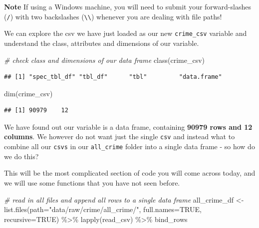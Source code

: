 \documentclass[
]{book}
\newenvironment{Shaded}{\begin{snugshade}}{\end{snugshade}}
\newcommand{\AttributeTok}[1]{\textcolor[rgb]{0.77,0.63,0.00}{#1}}
\newcommand{\CommentTok}[1]{\textcolor[rgb]{0.56,0.35,0.01}{\textit{#1}}}
\newcommand{\ConstantTok}[1]{\textcolor[rgb]{0.00,0.00,0.00}{#1}}
\newcommand{\FunctionTok}[1]{\textcolor[rgb]{0.00,0.00,0.00}{#1}}
\newcommand{\NormalTok}[1]{#1}
\newcommand{\OtherTok}[1]{\textcolor[rgb]{0.56,0.35,0.01}{#1}}
\newcommand{\SpecialCharTok}[1]{\textcolor[rgb]{0.00,0.00,0.00}{#1}}
\newcommand{\StringTok}[1]{\textcolor[rgb]{0.31,0.60,0.02}{#1}}
\begin{document}
\textbf{Note}
If using a Windows machine, you will need to submit your forward-slashes (\texttt{/}) with two backslashes (\texttt{\textbackslash{}\textbackslash{}}) whenever you are dealing with file paths!

We can explore the csv we have just loaded as our new \texttt{crime\_csv} variable and understand the class, attributes and dimensions of our variable.

\begin{Shaded}
\begin{Highlighting}[]
\CommentTok{\# check class and dimensions of our data frame}
\FunctionTok{class}\NormalTok{(crime\_csv)}
\end{Highlighting}
\end{Shaded}

\begin{verbatim}
## [1] "spec_tbl_df" "tbl_df"      "tbl"         "data.frame"
\end{verbatim}

\begin{Shaded}
\begin{Highlighting}[]
\FunctionTok{dim}\NormalTok{(crime\_csv)}
\end{Highlighting}
\end{Shaded}

\begin{verbatim}
## [1] 90979    12
\end{verbatim}

We have found out our variable is a data frame, containing \textbf{90979 rows and 12 columns}. We however do not want just the single \texttt{csv} and instead what to combine all our \texttt{csv\textquotesingle{}s} in our \texttt{all\_crime} folder into a single data frame - so how do we do this?

This will be the most complicated section of code you will come across today, and we will use some functions that you have not seen before.

\begin{Shaded}
\begin{Highlighting}[]
\CommentTok{\# read in all files and append all rows to a single data frame}
\NormalTok{all\_crime\_df }\OtherTok{\textless{}{-}} \FunctionTok{list.files}\NormalTok{(}\AttributeTok{path=}\StringTok{"data/raw/crime/all\_crime/"}\NormalTok{, }\AttributeTok{full.names=}\ConstantTok{TRUE}\NormalTok{, }\AttributeTok{recursive=}\ConstantTok{TRUE}\NormalTok{) }\SpecialCharTok{\%\textgreater{}\%}
  \FunctionTok{lapply}\NormalTok{(read\_csv) }\SpecialCharTok{\%\textgreater{}\%}
\NormalTok{  bind\_rows}
\end{Highlighting}
\end{Shaded}
\end{document}
